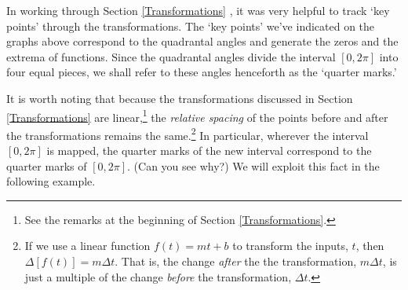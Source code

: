 \documentclass{ximera}
\begin{document}
\begin{image}
\end{image}


In working through Section \ref{Transformations} , it was very helpful to track `key points' through  the transformations.  The `key points' we've indicated on the graphs above correspond to the quadrantal angles and generate the zeros and the extrema of functions. Since the quadrantal angles divide the interval $[0,2\pi]$ into four equal pieces, we shall refer to these angles henceforth  as the  `quarter marks.'    



It is worth noting that because the transformations discussed in Section \ref{Transformations} are linear,\footnote{See the remarks at the beginning of Section \ref{Transformations}.}  the \textit{relative spacing} of the points before and after the transformations remains the same.\footnote{If we use a linear function $f(t) = mt + b$ to transform the inputs, $t$, then  $\Delta[f(t)] = m \Delta t$.  That is, the change \textit{after} the the transformation, $m \Delta t$, is just a multiple of the change \textit{before} the transformation, $\Delta t$.}  In particular, wherever the interval $[0, 2\pi]$ is mapped, the quarter marks of the new interval correspond to the quarter marks of $[0, 2\pi]$.  (Can you see why?) We will exploit this fact in the following example.
\end{document}
